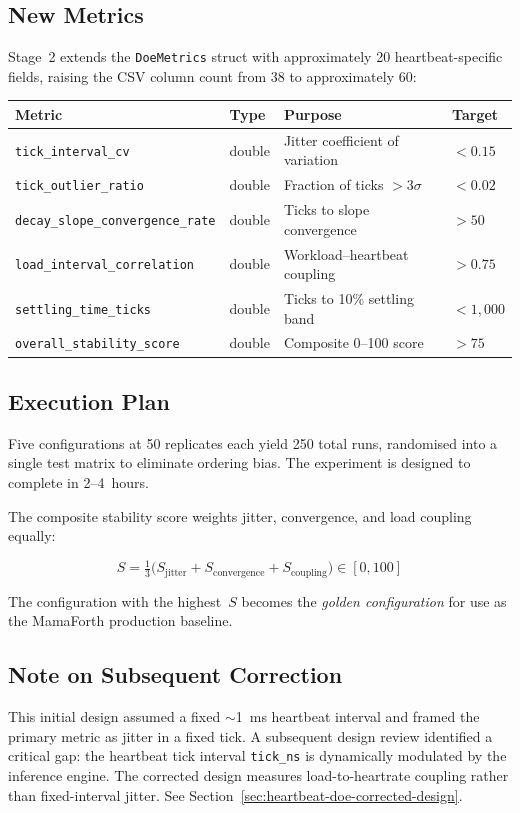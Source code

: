 \subsection{New Metrics}

Stage~2 extends the \texttt{DoeMetrics} struct with approximately 20
heartbeat-specific fields, raising the CSV column count from 38 to
approximately 60:

\begin{center}
\begin{tabular}{llll}
\toprule
Metric & Type & Purpose & Target \\
\midrule
\texttt{tick\_interval\_cv} & double & Jitter coefficient of variation & $< 0.15$ \\
\texttt{tick\_outlier\_ratio} & double & Fraction of ticks $> 3\sigma$ & $< 0.02$ \\
\texttt{decay\_slope\_convergence\_rate} & double & Ticks to slope convergence & $> 50$ \\
\texttt{load\_interval\_correlation} & double & Workload--heartbeat coupling & $> 0.75$ \\
\texttt{settling\_time\_ticks} & double & Ticks to 10\% settling band & $< 1{,}000$ \\
\texttt{overall\_stability\_score} & double & Composite 0--100 score & $> 75$ \\
\bottomrule
\end{tabular}
\end{center}

\subsection{Execution Plan}

Five configurations at 50 replicates each yield 250 total runs, randomised
into a single test matrix to eliminate ordering bias. The experiment is
designed to complete in 2--4~hours.

The composite stability score weights jitter, convergence, and load coupling
equally:

\[
  S = \tfrac{1}{3}\bigl(S_{\text{jitter}} + S_{\text{convergence}}
      + S_{\text{coupling}}\bigr) \in [0, 100]
\]

The configuration with the highest~$S$ becomes the \emph{golden
configuration} for use as the MamaForth production baseline.

\subsection{Note on Subsequent Correction}

This initial design assumed a fixed $\sim$1~ms heartbeat interval and framed
the primary metric as jitter in a fixed tick. A subsequent design review
identified a critical gap: the heartbeat tick interval \texttt{tick\_ns} is
dynamically modulated by the inference engine. The corrected design measures
load-to-heartrate coupling rather than fixed-interval jitter.
See Section~\ref{sec:heartbeat-doe-corrected-design}.

